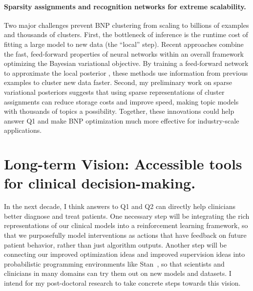 \documentclass[11pt,letterpaper,sans]{article}
\begin{document}
\paragraph{Sparsity assignments and recognition networks for extreme scalability.}
Two major challenges prevent BNP clustering from scaling to billions of examples and thousands of clusters. First, the bottleneck of inference is the runtime cost of fitting a large model to new data (the ``local'' step). Recent approaches  \cite{mnih2014neuralVariational} combine the fast, feed-forward properties of neural networks within an overall framework optimizing the Bayesian variational objective. By training a feed-forward network to approximate the local posterior \cite{gan2015deepTSBN}, these methods use information from previous examples to cluster new data faster. 
Second, my preliminary work on sparse variational posteriors \citep{hughes2016sparse} suggests that using sparse representations of cluster assignments can reduce storage costs and improve speed, making topic models with thousands of topics a possibility. Together, these innovations could help answer Q1 and make BNP optimization much more effective for industry-scale applications.



\section{Long-term Vision: Accessible tools for clinical decision-making.}

In the next decade, I think answers to Q1 and Q2 can directly help clinicians better diagnose and treat patients.
One necessary step will be integrating the rich representations of our clinical models into a reinforcement learning framework, so that we purposefully model interventions as actions that have feedback on future patient behavior, rather than just algorithm outputs.
Another step will be connecting our improved optimization ideas and improved supervision ideas into probabilistic programming environments like Stan~\citep{kucukelbir:Stan}, so that scientists and clinicians in many domains can try them out on new models and datasets.
I intend for my post-doctoral research to take concrete steps towards this vision.

{\scriptsize
    \setlength{\bibsep}{1pt}
    
}
\end{document}
